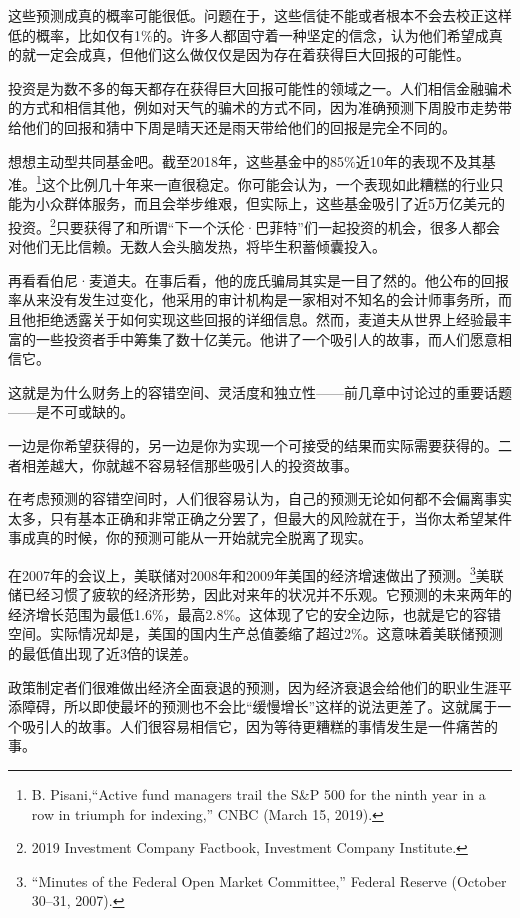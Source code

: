 这些预测成真的概率可能很低。问题在于，这些信徒不能或者根本不会去校正这样低的概率，比如仅有1\%的。许多人都固守着一种坚定的信念，认为他们希望成真的就一定会成真，但他们这么做仅仅是因为存在着获得巨大回报的可能性。

投资是为数不多的每天都存在获得巨大回报可能性的领域之一。人们相信金融骗术的方式和相信其他，例如对天气的骗术的方式不同，因为准确预测下周股市走势带给他们的回报和猜中下周是晴天还是雨天带给他们的回报是完全不同的。

想想主动型共同基金吧。截至2018年，这些基金中的85\%近10年的表现不及其基准。\footnote{B. Pisani,“Active fund managers trail the S\&P 500 for the ninth year in a row in triumph for indexing,” CNBC (March 15, 2019).}这个比例几十年来一直很稳定。你可能会认为，一个表现如此糟糕的行业只能为小众群体服务，而且会举步维艰，但实际上，这些基金吸引了近5万亿美元的投资。\footnote{2019 Investment Company Factbook, Investment Company Institute.}只要获得了和所谓“下一个沃伦·巴菲特”们一起投资的机会，很多人都会对他们无比信赖。无数人会头脑发热，将毕生积蓄倾囊投入。

再看看伯尼·麦道夫。在事后看，他的庞氏骗局其实是一目了然的。他公布的回报率从来没有发生过变化，他采用的审计机构是一家相对不知名的会计师事务所，而且他拒绝透露关于如何实现这些回报的详细信息。然而，麦道夫从世界上经验最丰富的一些投资者手中筹集了数十亿美元。他讲了一个吸引人的故事，而人们愿意相信它。

这就是为什么财务上的容错空间、灵活度和独立性——前几章中讨论过的重要话题——是不可或缺的。

一边是你希望获得的，另一边是你为实现一个可接受的结果而实际需要获得的。二者相差越大，你就越不容易轻信那些吸引人的投资故事。

在考虑预测的容错空间时，人们很容易认为，自己的预测无论如何都不会偏离事实太多，只有基本正确和非常正确之分罢了，但最大的风险就在于，当你太希望某件事成真的时候，你的预测可能从一开始就完全脱离了现实。

在2007年的会议上，美联储对2008年和2009年美国的经济增速做出了预测。\footnote{“Minutes of the Federal Open Market Committee,” Federal Reserve (October 30–31, 2007).}美联储已经习惯了疲软的经济形势，因此对来年的状况并不乐观。它预测的未来两年的经济增长范围为最低1.6\%，最高2.8\%。这体现了它的安全边际，也就是它的容错空间。实际情况却是，美国的国内生产总值萎缩了超过2\%。这意味着美联储预测的最低值出现了近3倍的误差。

政策制定者们很难做出经济全面衰退的预测，因为经济衰退会给他们的职业生涯平添障碍，所以即使最坏的预测也不会比“缓慢增长”这样的说法更差了。这就属于一个吸引人的故事。人们很容易相信它，因为等待更糟糕的事情发生是一件痛苦的事。


